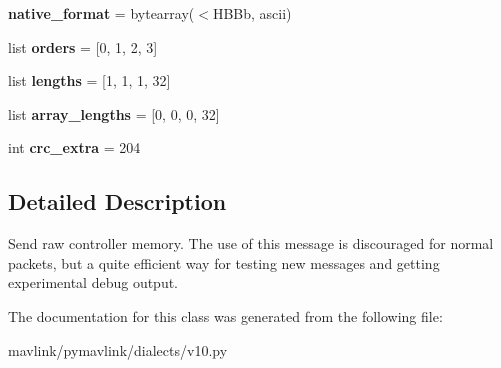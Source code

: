 \begin{DoxyCompactItemize}
{\bfseries native\+\_\+format} = bytearray(\textquotesingle{}$<$H\+B\+Bb\textquotesingle{}, \textquotesingle{}ascii\textquotesingle{})
\item 
\mbox{\label{classpymavlink_1_1dialects_1_1v10_1_1MAVLink__memory__vect__message_a3e69c144ee6f4fde8ba194eaef5ec09c}} 
list {\bfseries orders} = \mbox{[}0, 1, 2, 3\mbox{]}
\item 
\mbox{\label{classpymavlink_1_1dialects_1_1v10_1_1MAVLink__memory__vect__message_abec1496a05b138404a895cdf0a7f2f5a}} 
list {\bfseries lengths} = \mbox{[}1, 1, 1, 32\mbox{]}
\item 
\mbox{\label{classpymavlink_1_1dialects_1_1v10_1_1MAVLink__memory__vect__message_a85e47822fc93ba48fa3e6f214fbf5680}} 
list {\bfseries array\+\_\+lengths} = \mbox{[}0, 0, 0, 32\mbox{]}
\item 
\mbox{\label{classpymavlink_1_1dialects_1_1v10_1_1MAVLink__memory__vect__message_afcd7c5843e5e31d2fa04f1c32775b01e}} 
int {\bfseries crc\+\_\+extra} = 204
\end{DoxyCompactItemize}


\subsection{Detailed Description}
\begin{DoxyVerb}Send raw controller memory. The use of this message is
discouraged for normal packets, but a quite efficient way for
testing new messages and getting experimental debug output.
\end{DoxyVerb}
 

The documentation for this class was generated from the following file\+:\begin{DoxyCompactItemize}
\item 
mavlink/pymavlink/dialects/v10.\+py\end{DoxyCompactItemize}
